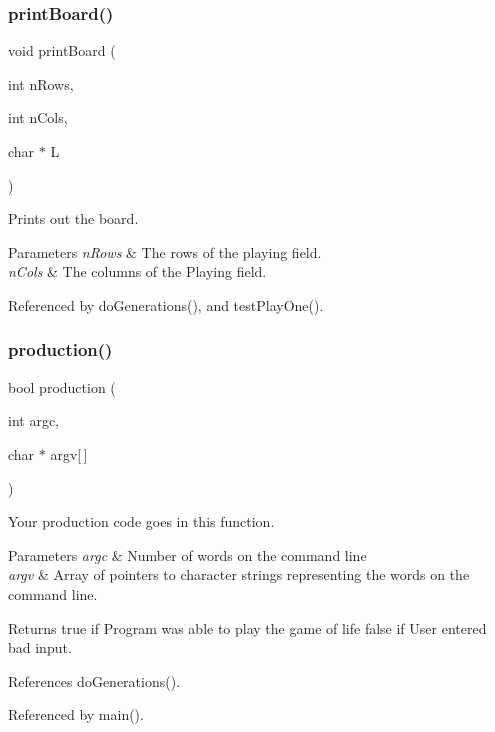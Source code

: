 \subsubsection{print\+Board()}
{\footnotesize\ttfamily void print\+Board (\begin{DoxyParamCaption}\item[{int}]{n\+Rows,  }\item[{int}]{n\+Cols,  }\item[{char $\ast$}]{L }\end{DoxyParamCaption})}

Prints out the board.


\begin{DoxyParams}{Parameters}
{\em n\+Rows} & The rows of the playing field. \\
\hline
{\em n\+Cols} & The columns of the Playing field. \\
\hline
\end{DoxyParams}


Referenced by do\+Generations(), and test\+Play\+One().

\mbox{\label{production_8h_a9f67b51c42a54745557e7a2c9c07c46f}} 
\subsubsection{production()}
{\footnotesize\ttfamily bool production (\begin{DoxyParamCaption}\item[{int}]{argc,  }\item[{char $\ast$}]{argv[$\,$] }\end{DoxyParamCaption})}

Your production code goes in this function.


\begin{DoxyParams}{Parameters}
{\em argc} & Number of words on the command line \\
\hline
{\em argv} & Array of pointers to character strings representing the words on the command line. \\
\hline
\end{DoxyParams}
\begin{DoxyReturn}{Returns}
true if Program was able to play the game of life false if User entered bad input. 
\end{DoxyReturn}


References do\+Generations().



Referenced by main().

